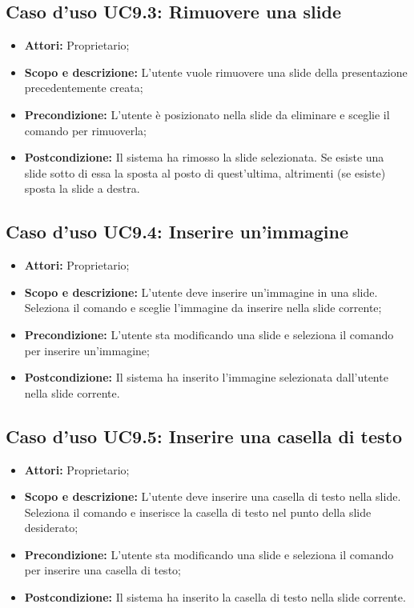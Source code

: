 \subsection{Caso d'uso UC9.3: Rimuovere una slide}
\begin{itemize}
	\item \textbf{Attori:} Proprietario;
	\item \textbf{Scopo e descrizione:} L'utente vuole rimuovere una \gls{slide} della presentazione precedentemente creata;
	\item \textbf{Precondizione:} L'utente è posizionato nella \gls{slide} da eliminare e sceglie il comando per rimuoverla;
	\item \textbf{Postcondizione:} Il sistema ha rimosso la \gls{slide} selezionata. Se esiste una slide sotto di essa la sposta al posto di quest'ultima, altrimenti (se esiste) sposta la slide a destra.
\end{itemize}


\subsection{Caso d'uso UC9.4: Inserire un'immagine}
\begin{itemize}
\item \textbf{Attori:} Proprietario;
\item \textbf{Scopo e descrizione:} L'utente deve inserire un'immagine in una \gls{slide}. Seleziona il comando e sceglie l'immagine da inserire nella \gls{slide} corrente;
\item \textbf{Precondizione:} L'utente sta modificando una \gls{slide} e seleziona il comando per inserire un'immagine;
\item \textbf{Postcondizione:} Il sistema ha inserito l'immagine selezionata dall'utente nella \gls{slide} corrente.
\end{itemize}


\subsection{Caso d'uso UC9.5: Inserire una casella di testo}
\begin{itemize}
\item \textbf{Attori:} Proprietario;
\item \textbf{Scopo e descrizione:} L'utente deve inserire una casella di testo nella \gls{slide}. Seleziona il comando e inserisce la casella di testo nel punto della \gls{slide} desiderato;
\item \textbf{Precondizione:} L'utente sta modificando una \gls{slide} e seleziona il comando per inserire una casella di testo;
\item \textbf{Postcondizione:} Il sistema ha inserito la casella di testo nella \gls{slide} corrente.
\end{itemize}


